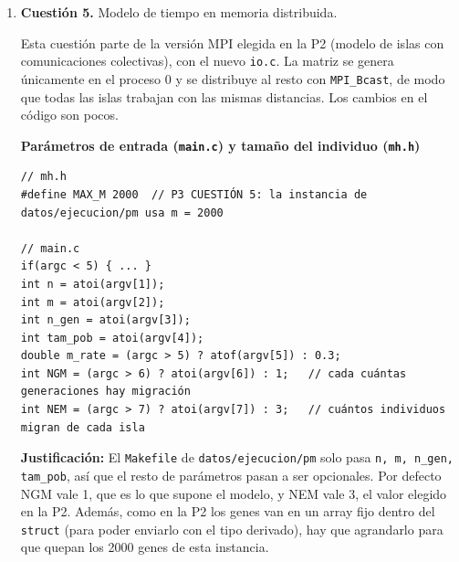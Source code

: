 \documentclass[12pt]{article}
\begin{document}
\begin{enumerate}
Cuanto más trabajo supone el modelo, con más individuos o individuos más grandes, mayor es el número de hilos que propone en los dos niveles. Ambos crecen con la raíz cúbica de $NE \cdot |B|$ y mantienen la proporción $h_2/h_1 = k_{h,1}/k_{h,2} \approx 1.43$. Así, para $NE = 3$ se obtienen aproximadamente $(2.55,3.66)$ y para $NE = 10$, $(3.81,5.46)$; con $NE = 6$ y los otros tamaños de individuo se obtienen $(2.74,3.94)$ y $(3.67,5.27)$. Estos casos se calculan sin lanzar nuevas ejecuciones, como pide el apartado 4.3.b. Son estimaciones del modelo instalado: la función de fitness suma $m(m-1)/2$ distancias, de modo que extrapolar en $m$ con un término proporcional a $|B|$ es una simplificación y no garantiza esos óptimos en la práctica.

\newpage
\item \textbf{Cuestión 5.} Modelo de tiempo en memoria distribuida.


Esta cuestión parte de la versión MPI elegida en la P2 (modelo de islas con comunicaciones colectivas), con el nuevo \texttt{io.c}. La matriz se genera únicamente en el proceso 0 y se distribuye al resto con \texttt{MPI\_Bcast}, de modo que todas las islas trabajan con las mismas distancias. Los cambios en el código son pocos.

\medskip
\noindent\textbf{Parámetros de entrada (\texttt{main.c}) y tamaño del individuo (\texttt{mh.h})}\par
\smallskip

\begin{lstlisting}[style=EstiloC]
// mh.h
#define MAX_M 2000  // P3 CUESTIÓN 5: la instancia de datos/ejecucion/pm usa m = 2000

// main.c
if(argc < 5) { ... }
int n = atoi(argv[1]);
int m = atoi(argv[2]);
int n_gen = atoi(argv[3]);
int tam_pob = atoi(argv[4]);
double m_rate = (argc > 5) ? atof(argv[5]) : 0.3;
int NGM = (argc > 6) ? atoi(argv[6]) : 1;   // cada cuántas generaciones hay migración
int NEM = (argc > 7) ? atoi(argv[7]) : 3;   // cuántos individuos migran de cada isla
\end{lstlisting}

\textbf{Justificación:} El \texttt{Makefile} de \texttt{datos/ejecucion/pm} solo pasa \texttt{n, m, n\_gen, tam\_pob}, así que el resto de parámetros pasan a ser opcionales. Por defecto NGM vale 1, que es lo que supone el modelo, y NEM vale 3, el valor elegido en la P2. Además, como en la P2 los genes van en un array fijo dentro del \texttt{struct} (para poder enviarlo con el tipo derivado), hay que agrandarlo para que quepan los 2000 genes de esta instancia.


\end{enumerate}
\end{document}
